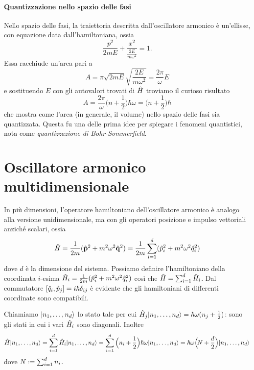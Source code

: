 \paragraph{Quantizzazione nello spazio delle fasi}
Nello spazio delle fasi, la traiettoria descritta dall'oscillatore armonico è un'ellisse, con equazione data dall'hamiltoniana, ossia
\begin{equation}
	\frac{p^2}{2mE}+\frac{x^2}{\frac{2E}{m\omega^2}}=1.
\end{equation}
Essa racchiude un'area pari a
\begin{equation}
	A=\pi \sqrt{2mE}\sqrt{\frac{2E}{m\omega^2}}=\frac{2\pi}{\omega}E
\end{equation}
e sostituendo $E$ con gli autovalori trovati di $\hat{H}$ troviamo il curioso risultato
\begin{equation}
	A=\frac{2\pi}{\omega}\Big(n+\frac12\Big)\hbar\omega=\Big(n+\frac12\Big)\hbar
\end{equation}
che mostra come l'area (in generale, il volume) nello spazio delle fasi sia quantizzata.
Questa fu una delle prima idee per spiegare i fenomeni quantistici, nota come \emph{quantizzazione di Bohr-Sommerfield}.

\section{Oscillatore armonico multidimensionale}
In più dimensioni, l'operatore hamiltoniano dell'oscillatore armonico è analogo alla versione unidimensionale, ma con gli operatori posizione e impulso vettoriali anzich\'e scalari, ossia
\begin{equation}
	\hat{H}=\frac1{2m}(\hat{\mathbf{p}}^2+m^2\omega^2\hat{\mathbf{q}}^2)=\frac1{2m}\sum_{i=1}^d(\hat{p}_i^2+m^2\omega^2\hat{q}_i^2)
	\label{eq:hamiltoniano-oscillatore-armonico-multidim}
\end{equation}
dove $d$ è la dimensione del sistema.
Possiamo definire l'hamiltoniano della coordinata $i$-esima $\hat{H}_i=\frac1{2m}(\hat{p}_i^2+m^2\omega^2\hat{q}_i^2)$ cos\`i che $\hat{H}=\sum_{i=1}^d\hat{H}_i$.
Dal commutatore $[\hat{q}_i,\hat{p}_j]=i\hbar\delta_{ij}$ è evidente che gli hamiltoniani di differenti coordinate sono compatibili.

Chiamiamo $\lvert n_1,\dots,n_d\rangle$ lo stato tale per cui $\hat{H}_j\lvert n_1,\dots,n_d\rangle=\hbar\omega(n_j+\frac12)$: sono gli stati in cui i vari $\hat{H}_i$ sono diagonali.
Inoltre
\begin{equation}
	\hat{H}\lvert n_1,\dots,n_d\rangle=\sum_{i=1}^d\hat{H}_i\lvert n_1,\dots,n_d\rangle=\sum_{i=1}^d\Big(n_i+\frac12\Big)\hbar\omega\lvert n_1,\dots,n_d\rangle=\hbar\omega\Big(\!N+\frac{d}2\Big)\lvert n_1,\dots,n_d\rangle
\end{equation}
dove $N\defeq\sum_{i=1}^dn_i$.

